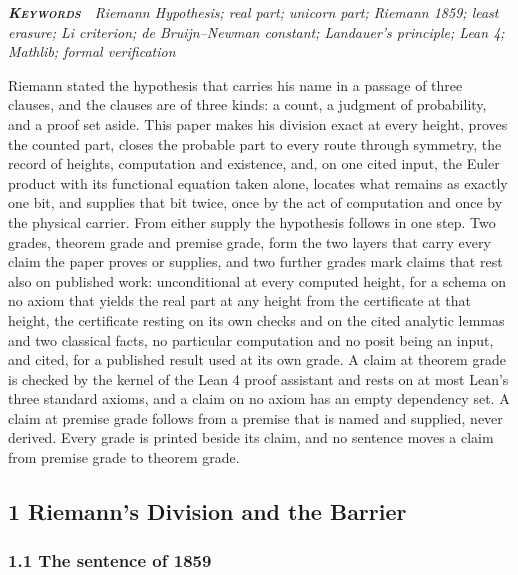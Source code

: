 \documentclass[10pt]{article}
\begin{document}
\vspace{4pt}\noindent{\color{accent}\rule{\textwidth}{0.6pt}}\par\vspace{3pt}
{\noindent\itshape\footnotesize\color{faint}\textbf{\upshape\scshape\color{deep}Keywords}\ \ Riemann
Hypothesis; real part; unicorn part; Riemann 1859; least erasure; Li
criterion; de Bruijn--Newman constant; Landauer's principle; Lean 4;
Mathlib; formal verification\par}\vspace{12pt}
Riemann stated the hypothesis that carries his name in a passage of
three clauses, and the clauses are of three kinds: a count, a judgment
of probability, and a proof set aside. This paper makes his division
exact at every height, proves the counted part, closes the probable part
to every route through symmetry, the record of heights, computation and
existence, and, on one cited input, the Euler product with its
functional equation taken alone, locates what remains as exactly one
bit, and supplies that bit twice, once by the act of computation and
once by the physical carrier. From either supply the hypothesis follows
in one step. Two grades, theorem grade and premise grade, form the two
layers that carry every claim the paper proves or supplies, and two
further grades mark claims that rest also on published work:
unconditional at every computed height, for a schema on no axiom that
yields the real part at any height from the certificate at that height,
the certificate resting on its own checks and on the cited analytic
lemmas and two classical facts, no particular computation and no posit
being an input, and cited, for a published result used at its own grade.
A claim at theorem grade is checked by the kernel of the Lean 4 proof
assistant and rests on at most Lean's three standard axioms, and a claim
on no axiom has an empty dependency set. A claim at premise grade
follows from a premise that is named and supplied, never derived. Every
grade is printed beside its claim, and no sentence moves a claim from
premise grade to theorem grade.

\hypertarget{riemanns-division-and-the-barrier}{%
\subsection{1 Riemann's Division and the
Barrier}\label{riemanns-division-and-the-barrier}}

\hypertarget{the-sentence-of-1859}{%
\subsubsection{1.1 The sentence of 1859}\label{the-sentence-of-1859}}
\end{document}

